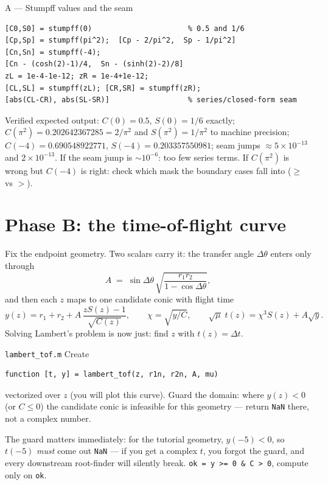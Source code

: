 \documentclass[11pt,letterpaper]{article}
\newcommand{\dth}{\Delta\theta}
\begin{document}
\begin{checkpoint}{A --- Stumpff values and the seam}
\begin{verbatim}
[C0,S0] = stumpff(0)                      % 0.5 and 1/6
[Cp,Sp] = stumpff(pi^2);  [Cp - 2/pi^2,  Sp - 1/pi^2]
[Cn,Sn] = stumpff(-4);
[Cn - (cosh(2)-1)/4,  Sn - (sinh(2)-2)/8]
zL = 1e-4-1e-12; zR = 1e-4+1e-12;
[CL,SL] = stumpff(zL); [CR,SR] = stumpff(zR);
[abs(CL-CR), abs(SL-SR)]                  % series/closed-form seam
\end{verbatim}
Verified expected output: $C(0) = 0.5$, $S(0) = 1/6$ exactly;
$C(\pi^2) = 0.202642367285 = 2/\pi^2$ and $S(\pi^2) = 1/\pi^2$ to machine
precision; $C(-4) = 0.690548922771$, $S(-4) = 0.203357550981$; seam jumps
$\approx 5\times10^{-13}$ and $2\times10^{-13}$. If the seam jump is
$\sim$$10^{-6}$: too few series terms. If $C(\pi^2)$ is wrong but $C(-4)$
is right: check which mask the boundary cases fall into ($\ge$ vs $>$).
\end{checkpoint}

\section{Phase B: the time-of-flight curve}

Fix the endpoint geometry. Two scalars carry it: the transfer angle
$\dth$ enters only through
\[
  A \;=\; \sin\dth\,\sqrt{\frac{r_1 r_2}{1 - \cos\dth}},
\]
and then each $z$ maps to one candidate conic with flight time
\[
  y(z) = r_1 + r_2 + A\,\frac{zS(z) - 1}{\sqrt{C(z)}},\qquad
  \chi = \sqrt{y/C},\qquad
  \sqrt{\mu}\;t(z) = \chi^3 S(z) + A\sqrt{y}.
\]
Solving Lambert's problem is now just: find $z$ with $t(z) = \Delta t$.

\begin{exercise}{\texttt{lambert\_tof.m}}
Create
\begin{verbatim}
function [t, y] = lambert_tof(z, r1n, r2n, A, mu)
\end{verbatim}
vectorized over $z$ (you will plot this curve). Guard the domain: where
$y(z) < 0$ (or $C \le 0$) the candidate conic is infeasible for this
geometry --- return \texttt{NaN} there, not a complex number.
\end{exercise}

\begin{hint}
The guard matters immediately: for the tutorial geometry, $y(-5) < 0$, so
$t(-5)$ \emph{must} come out \texttt{NaN} --- if you get a complex $t$,
you forgot the guard, and every downstream root-finder will silently
break. \texttt{ok = y >= 0 \& C > 0}, compute only on \texttt{ok}.
\end{hint}
\end{document}
